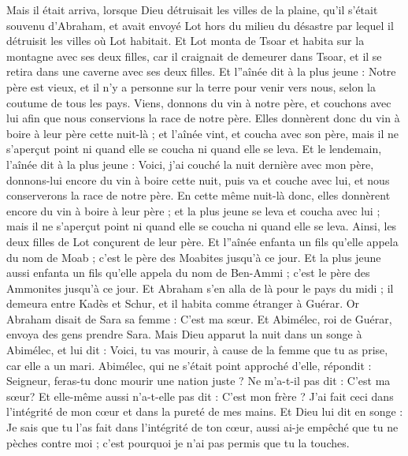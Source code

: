\begin{multicols}{2}
Mais il était arriva, lorsque Dieu détruisait les villes de la plaine, qu'il s'était souvenu d'Abraham, et avait envoyé Lot hors du milieu du désastre par lequel il détruisit les villes où Lot habitait.
Et Lot monta de Tsoar et habita sur la montagne avec ses deux filles, car il craignait de demeurer dans Tsoar, et il se retira dans une caverne avec ses deux filles.
Et l''aînée dit à la plus jeune : Notre père est vieux, et il n'y a personne sur la terre pour venir vers nous, selon la coutume de tous les pays.
Viens, donnons du vin à notre père, et couchons avec lui afin que nous conservions la race de notre père.
Elles donnèrent donc du vin à boire à leur père cette nuit-là ; et l'aînée vint, et coucha avec son père, mais il ne s'aperçut point ni quand elle se coucha ni quand elle se leva.
Et le lendemain, l'aînée dit à la plus jeune : Voici, j'ai couché la nuit dernière avec mon père, donnons-lui encore du vin à boire cette nuit, puis va et couche avec lui, et nous conserverons la race de notre père.
En cette même nuit-là donc, elles donnèrent encore du vin à boire à leur père ; et la plus jeune se leva et coucha avec lui ; mais il ne s'aperçut point ni quand elle se coucha ni quand elle se leva.
Ainsi, les deux filles de Lot conçurent de leur père.
Et l''aînée enfanta un fils qu'elle appela du nom de Moab ; c'est le père des Moabites jusqu'à ce jour.
Et la plus jeune aussi enfanta un fils qu'elle appela du nom de Ben-Ammi ; c'est le père des Ammonites jusqu'à ce jour.
\VerseOne{}Et Abraham s'en alla de là pour le pays du midi ; il demeura entre Kadès et Schur, et il habita comme étranger à Guérar.
Or Abraham disait de Sara sa femme : C'est ma sœur. Et Abimélec, roi de Guérar, envoya des gens prendre Sara.
Mais Dieu apparut la nuit dans un songe à Abimélec, et lui dit : Voici, tu vas mourir, à cause de la femme que tu as prise, car elle a un mari.
Abimélec, qui ne s'était point approché d'elle, répondit : Seigneur, feras-tu donc mourir une nation juste ?
Ne m'a-t-il pas dit : C'est ma sœur? Et elle-même aussi n'a-t-elle pas dit : C'est mon frère ? J'ai fait ceci dans l'intégrité de mon cœur et dans la pureté de mes mains.
Et Dieu lui dit en songe : Je sais que tu l'as fait dans l'intégrité de ton cœur, aussi ai-je empêché que tu ne pèches contre moi ; c'est pourquoi je n'ai pas permis que tu la touches.

\end{multicols}
